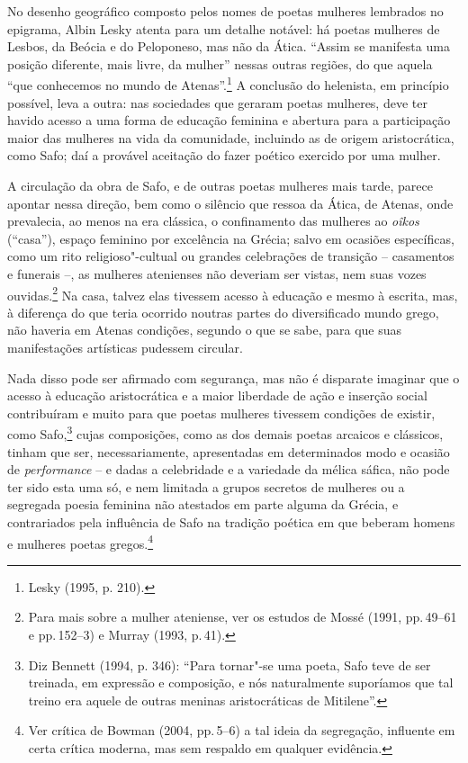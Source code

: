 No desenho geográfico composto pelos nomes de poetas mulheres
lembrados no epigrama, Albin Lesky atenta para um detalhe
notável: há poetas mulheres de Lesbos, da Beócia e do Peloponeso, mas não da
Ática. “Assim se manifesta uma posição diferente, mais livre, da mulher”
nessas outras regiões, do que aquela “que conhecemos no mundo de Atenas”.\footnote{ Lesky (1995, p. 210).} A
conclusão do helenista, em princípio possível, leva a outra: nas sociedades
que geraram poetas mulheres, deve ter havido acesso a uma forma de educação
feminina e abertura para a participação maior das mulheres na vida da
comunidade, incluindo as de origem aristocrática, como Safo; daí a provável
aceitação do fazer poético exercido por uma mulher.

A circulação da obra de Safo, e de outras poetas mulheres mais tarde, parece
apontar nessa direção, bem como o silêncio que ressoa da Ática, de Atenas, onde
prevalecia, ao menos na era clássica, o confinamento das mulheres ao \textit{oîkos} (“casa”), espaço
feminino por excelência na Grécia; salvo em ocasiões específicas, como um rito
religioso"-cultual ou grandes celebrações de transição -- casamentos e funerais --, as mulheres atenienses não deveriam ser vistas, nem suas
vozes ouvidas.\footnote{ Para mais sobre a mulher ateniense, ver os estudos de
Mossé (1991, pp.\,49--61 e pp.\,152--3) e Murray (1993, p.\,41).} Na casa, talvez elas
tivessem acesso à educação e mesmo à escrita, mas, à diferença do que teria
ocorrido noutras partes do diversificado mundo grego, não haveria em Atenas
condições, segundo o que se sabe, para que suas manifestações artísticas
pudessem circular.

Nada disso pode ser afirmado com segurança, mas não é disparate imaginar que o acesso
à educação aristocrática e a maior liberdade de ação e inserção social
contribuíram e muito para que poetas mulheres tivessem condições de existir,
como Safo,\footnote{ Diz Bennett (1994, p. 346):
“Para tornar"-se uma poeta, Safo teve de ser treinada, em expressão
e composição, e nós naturalmente suporíamos que tal treino era aquele de outras
meninas aristocráticas de Mitilene”.} cujas composições, como as dos demais
poetas arcaicos e clássicos, tinham que ser, necessariamente, apresentadas em
determinados modo e ocasião de \textit{performance} -- e dadas a celebridade e a variedade da mélica sáfica, não pode ter sido esta uma só, e nem limitada
a grupos secretos de mulheres ou a segregada poesia feminina não atestados em parte alguma da Grécia, e contrariados pela influência de Safo na tradição poética em que beberam homens e mulheres poetas gregos.\footnote{Ver crítica de Bowman (2004, pp.\,5--6) a tal ideia da segregação, influente em certa crítica moderna, mas sem respaldo em qualquer evidência.}

